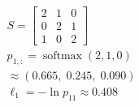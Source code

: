 \documentclass[border=6pt]{standalone}
\begin{document}
\color{ink}\begin{minipage}{165pt}\centering$\displaystyle \begin{gathered}S=\begin{bmatrix}2&1&0\\0&2&1\\1&0&2\end{bmatrix}\\[5pt]p_{1,:}=\operatorname{softmax}(2,1,0)\\\approx(0.665,\;0.245,\;0.090)\\\ell_1=-\ln p_{11}\approx0.408\end{gathered}$\end{minipage}
\end{document}

